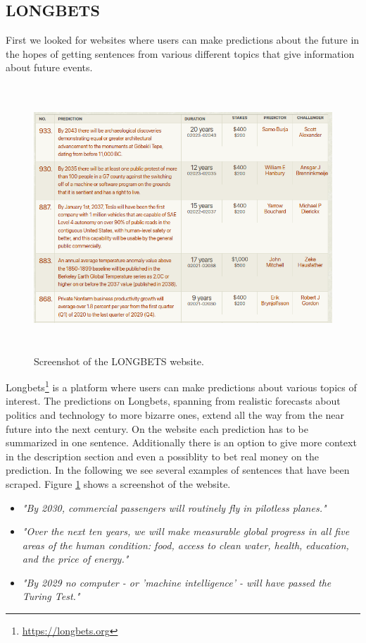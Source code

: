 \documentclass[a4paper,10pt]{report}
\begin{document}
\subsection{LONGBETS}
First we looked for websites where users can make predictions about the future in the hopes of getting sentences from various different topics that give information about future events.
\begin{figure}
  \centering
  \includegraphics[height=10cm]{img/longbets.png}
  \caption{Screenshot of the LONGBETS website.}
  \label{fig:longbets}
\end{figure}
Longbets\footnote{\url{https://longbets.org}} is a platform where users can make predictions about various topics of interest.
The predictions on Longbets, spanning from realistic forecasts about politics and technology to more bizarre ones, extend all the way from the near future into the next century.
On the website each prediction has to be summarized in one sentence. Additionally there is an option to give more context in the description section and even a possiblity to bet real money on the prediction.      
In the following we see several examples of sentences that have been scraped. Figure \ref{fig:longbets} shows a screenshot of the website.
\begin{itemize}
  \item \textit{"By 2030, commercial passengers will routinely fly in pilotless planes."}
  \item \textit{"Over the next ten years, we will make measurable global progress in all five areas of the human condition: food, access to clean water, health, education, and the price of energy."}
  \item \textit{"By 2029 no computer - or 'machine intelligence' - will have passed the Turing Test."}
\end{itemize}
    
\end{document}
